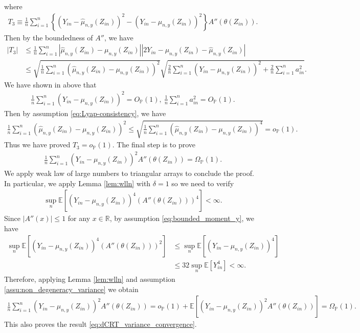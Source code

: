 \documentclass[12pt]{article}
\theoremstyle{definition}
\def\P{\mathbb{P}}
\def\P{\mathbb{P}}
\newcommand{\E}{\mathbb E}								%
\renewcommand{\P}{\mathbb{P}}							%
\newcommand{\srz}{Z}									%
\newcommand{\sry}{Y}									%
\begin{document}
	where 
	\begin{align*}
		T_3\equiv  \frac{1}{n}\sum_{i=1}^n \left\{(\sry_{in}-\widehat \mu_{n,y}(\srz_{in}))^2-(\sry_{in}- \mu_{n,y}(\srz_{in}))^2\right\}A''(\theta(\srz_{in})).
	\end{align*}
	Then by the boundedness of $A''$, we have 
	\begin{align*}
		|T_3|
		&
		\leq \frac{1}{n}\sum_{i=1}^n|\widehat{\mu}_{n,y}(\srz_{in})-\mu_{n,y}(\srz_{in})||2\sry_{in}-\mu_{n,y}(\srz_{in})-\widehat\mu_{n,y}(\srz_{in})|\\
		&
		\leq \sqrt{\frac{1}{n}\sum_{i=1}^n (\widehat{\mu}_{n,y}(\srz_{in})-\mu_{n,y}(\srz_{in}))^2}\sqrt{\frac{2}{n}\sum_{i=1}^n (\sry_{in}-\mu_{n,y}(\srz_{in}))^2+\frac{2}{n}\sum_{i=1}^n a_{in}^2}.
	\end{align*}
	We have shown in above that 
	\begin{align*}
		\frac{1}{n}\sum_{i=1}^n (\sry_{in}-\mu_{n,y}(\srz_{in}))^2=O_{\P}(1),\ \frac{1}{n}\sum_{i=1}^n a_{in}^2=O_{\P}(1).
	\end{align*}
	Then by assumption \eqref{eq:Lyap-consistency}, we have 
	\begin{align*}
		\frac{1}{n}\sum_{i=1}^n (\widehat{\mu}_{n,y}(\srz_{in})-\mu_{n,y}(\srz_{in}))^2\leq \sqrt{\frac{1}{n}\sum_{i=1}^n (\widehat{\mu}_{n,y}(\srz_{in})-\mu_{n,y}(\srz_{in}))^4}=o_{\P}(1).
	\end{align*}
	Thus we have proved $T_3=o_{\P}(1)$. The final step is to prove 
	\begin{align*}
		\frac{1}{n}\sum_{i=1}^n (\sry_{in}-\mu_{n,y}(\srz_{in}))^2A''(\theta(\srz_{in}))=\Omega_{\P}(1).
	\end{align*}
	We apply weak law of large numbers to triangular arrays to conclude the proof. In particular, we apply Lemma \ref{lem:wlln} with $\delta=1$ so we need to verify 
	\begin{align*}
		\sup_n\E[(\sry_{in}-\mu_{n,y}(\srz_{in}))^4(A''(\theta(\srz_{in})))^4]<\infty.
	\end{align*}
	Since $|A''(x)|\leq 1$ for any $x\in\mathbb{R}$, by assumption \eqref{eq:bounded_moment_y}, we have
	\begin{align*}
		\sup_n\E[(\sry_{in}-\mu_{n,y}(\srz_{in}))^4(A''(\theta(\srz_{in})))^2]
		&
		\leq \sup_n\E[(\sry_{in}-\mu_{n,y}(\srz_{in}))^4]\\
		&
		\leq 32\sup_n\E[\sry_{in}^4]<\infty.
	\end{align*} 
	Therefore, applying Lemma \ref{lem:wlln} and assumption \ref{assu:non_degeneracy_variance} we obtain 
	\begin{align*}
		\frac{1}{n}\sum_{i=1}^n (\sry_{in}-\mu_{n,y}(\srz_{in}))^2A''(\theta(\srz_{in}))=o_{\P}(1)+\E[(\sry_{in}-\mu_{n,y}(\srz_{in}))^2A''(\theta(\srz_{in}))]=\Omega_{\P}(1).
	\end{align*}
  This also proves the result \eqref{eq:dCRT_variance_convergence}.
\end{document}
